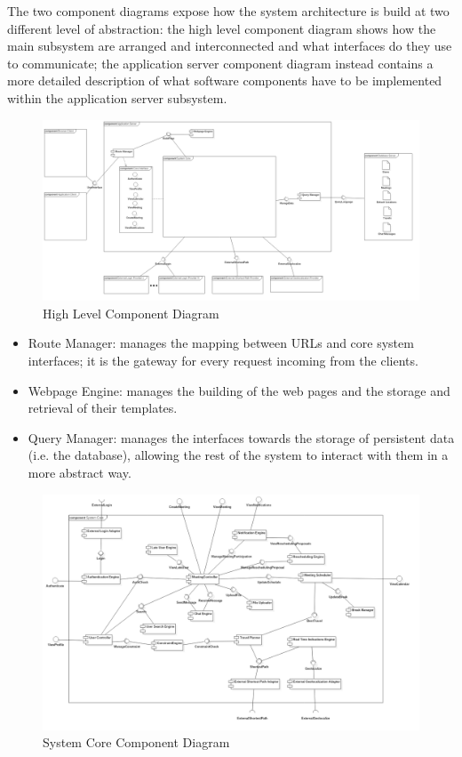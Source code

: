 The two component diagrams expose how the system architecture is build at two different level of abstraction: the high level component diagram shows how the main subsystem are arranged and interconnected and what interfaces do they use to communicate; the application server component diagram instead contains a more detailed description of what software components have to be implemented within the application server subsystem.

\begin{figure}[h]
\centering\includegraphics[width=\textwidth]{Images/UMLDiagrams/HighLevelComponentDiagram.png}
\caption{High Level Component Diagram}
\end{figure}

\begin{itemize}
\item Route Manager: manages the mapping between URLs and core system interfaces; it is the gateway for every request incoming from the clients.
\item Webpage Engine: manages the building of the web pages and the storage and retrieval of their templates.
\item Query Manager: manages the interfaces towards the storage of persistent data (i.e. the database), allowing the rest of the system to interact with them in a more abstract way.
\end{itemize}

\begin{figure}[h]
\centering\includegraphics[width=\textwidth]{Images/UMLDiagrams/ApplicationComponentDiagram.png}
\caption{System Core Component Diagram}
\end{figure}

